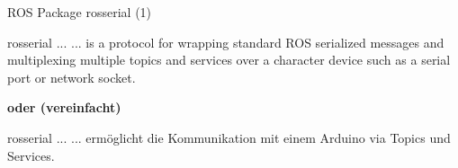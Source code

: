 \documentclass{beamer}
\begin{document}
\begin{frame}{ROS Package rosserial (1)}
\begin{alertblock}{rosserial ...}
... is a protocol for wrapping standard ROS serialized messages and multiplexing multiple topics and services over a character device such as a serial port or network socket.
\end{alertblock}
\vspace{10px}
\begin{large}\textbf{oder (vereinfacht)}\end{large}
\vspace{10px}
\begin{alertblock}{rosserial ...}
... erm\"oglicht die Kommunikation mit einem Arduino via Topics und Services.
\end{alertblock}
\end{frame}
\end{document}
